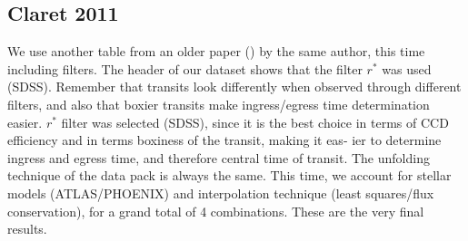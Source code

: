 \documentclass[a4paper,11pt,twocolumn]{article}
\begin{document}
\subsection{Claret 2011}
We use another table from an older paper (\cite{claret2011}) by the same author, 
this time including filters. The header of our dataset shows that the filter $r^{*}$
was used (SDSS). Remember that transits look differently 
when observed through different filters, and also that boxier transits make 
ingress/egress time determination easier. $r^*$ filter was selected
(SDSS), since it
is the best choice in terms of CCD efficiency and
in terms boxiness of the transit, making it eas-
ier to determine ingress and egress time, and
therefore central time of transit.
The unfolding technique of the 
data pack is always the same.
This time, we account for stellar models (ATLAS/PHOENIX) and interpolation 
technique (least squares/flux conservation), for a grand total of 4 
combinations. These are the very final results.
\end{document}
